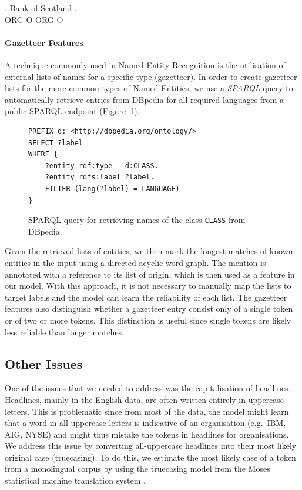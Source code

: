 \documentclass[11pt]{article}
\begin{document}
\exg. Bank of Scotland . \\ 
      ORG  O  ORG      O  \\\label{seq3}
    

\paragraph*{Gazetteer Features}
A technique commonly used in Named Entity Recognition is the utilisation of external lists of names for a specific type (gazetteer). 
In order to create gazetteer lists for the more common types of Named Entities, we use a \emph{SPARQL} query 
to automatically retrieve entries from DBpedia for all required languages from a public SPARQL endpoint (Figure~\ref{fig:sparql}).

\begin{figure}
\begin{verbatim}
PREFIX d: <http://dbpedia.org/ontology/>
SELECT ?label
WHERE {
    ?entity rdf:type   d:CLASS.
    ?entity rdfs:label ?label.
    FILTER (lang(?label) = LANGUAGE)
}
\end{verbatim}
\caption{SPARQL query for retrieving names of the class \texttt{CLASS} from DBpedia.}
\label{fig:sparql}

\end{figure}

Given the retrieved lists of entities, we then mark the longest matches of known entities in the input using a directed acyclic word graph. 
The mention is annotated with a reference to its list of origin, which is then used as a feature in our model.  With this approach, it is not necessary to manually map the lists to target labels and the model can learn the reliability of each list. The gazetteer features also distinguish whether a gazetteer entry consist only of a single token or of two or more tokens. This distinction is useful since single tokens are likely less reliable than longer matches.


\subsection{Other Issues}

One of the issues that we needed to address was the capitalisation of headlines. Headlines, mainly in the English data, are often written entirely 
in uppercase letters. This is problematic since from most of the data, the model might learn that a word in all uppercase letters is 
indicative of an organisation (e.g.\ IBM, AIG, NYSE) and might thus mistake the tokens in headlines for organisations. 
We address this issue by converting all-uppercase headlines into their most likely original case (truecasing). 
To do this, we estimate the most likely case of a token from a monolingual corpus by using the truecasing model from the 
Moses statistical machine translation system \cite{koehn2007moses}. 
\end{document}
